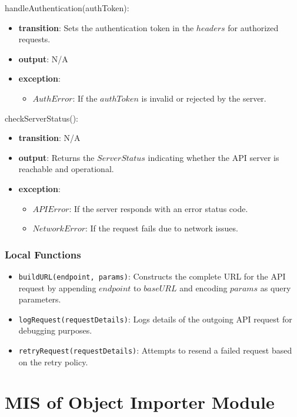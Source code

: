 \documentclass[12pt, titlepage]{article}
\begin{document}
\noindent handleAuthentication(authToken):
\begin{itemize}
  \item \textbf{transition}:
        Sets the authentication token in the \( headers \) for authorized requests.
  \item \textbf{output}: N/A
  \item \textbf{exception}:
        \begin{itemize}
          \item \( AuthError \): If the \( authToken \) is invalid or rejected by the server.
        \end{itemize}
\end{itemize}

\noindent checkServerStatus():
\begin{itemize}
  \item \textbf{transition}: N/A
  \item \textbf{output}:
        Returns the \( ServerStatus \) indicating whether the API server is reachable and operational.
  \item \textbf{exception}:
        \begin{itemize}
          \item \( APIError \): If the server responds with an error status code.
          \item \( NetworkError \): If the request fails due to network issues.
        \end{itemize}
\end{itemize}

\subsubsection{Local Functions}

\begin{itemize}
  \item \texttt{buildURL(endpoint, params)}: Constructs the complete URL for the API request by appending \( endpoint \) to \( baseURL \) and encoding \( params \) as query parameters.
  \item \texttt{logRequest(requestDetails)}: Logs details of the outgoing API request for debugging purposes.
  \item \texttt{retryRequest(requestDetails)}: Attempts to resend a failed request based on the retry policy.
\end{itemize}

\newpage

\section{MIS of Object Importer Module} \label{object-importer}
\end{document}
